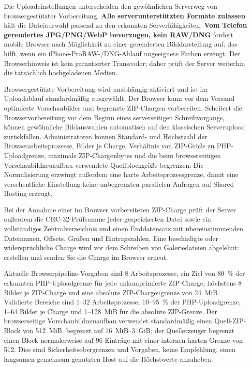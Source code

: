 \documentclass[11pt,a4paper]{article}
\newcommand{\ui}[1]{\textbf{#1}}
\begin{document}
Die Uploadeinstellungen unterscheiden den gewöhnlichen Serverweg von
browsergestützter Vorbereitung. \ui{Alle serverunterstützten Formate zulassen}
hält die Dateiauswahl passend zu den erkannten Serverfähigkeiten. \ui{Vom
Telefon gerendertes JPG/PNG/WebP bevorzugen, kein RAW/DNG} fordert mobile
Browser nach Möglichkeit zu einer gerenderten Bilddarstellung auf; das hilft,
wenn ein iPhone-ProRAW-/DNG-Ablauf ungeeignete Farben erzeugt. Der
Browserhinweis ist kein garantierter Transcoder; daher prüft der Server
weiterhin die tatsächlich hochgeladenen Medien.

Browsergestützte Vorbereitung wird unabhängig aktiviert und ist im Uploadablauf
standardmäßig ausgewählt. Der Browser kann vor dem Versand optimierte
Vorschaubilder und begrenzte ZIP-Chargen vorbereiten. Scheitert die
Browservorbereitung vor dem Beginn eines serverseitigen Schreibvorgangs, können
gewöhnliche Bildauswahlen automatisch auf den klassischen Serverupload
zurückfallen. Administratoren können Standard- und Höchstzahl der
Browserarbeitsprozesse, Bilder je Charge, Verhältnis von ZIP-Größe zu
PHP-Uploadgrenze, maximale ZIP-Chargenbytes und die beim browserseitigen
Vorschaubildneuaufbau verwendete Quellblockgröße begrenzen. Die Normalisierung
erzwingt außerdem eine harte Arbeitsprozessgrenze, damit eine versehentliche
Einstellung keine unbegrenzten parallelen Anfragen auf Shared Hosting erzeugt.

Bei der Annahme einer im Browser vorbereiteten ZIP-Charge prüft der Server
außerdem die CRC-32-Prüfsumme jeder gespeicherten Datei sowie ein vollständiges
Zentralverzeichnis und einen Enddatensatz mit übereinstimmenden Dateinamen,
Offsets, Größen und Eintragszahlen. Eine beschädigte oder widersprüchliche
Charge wird vor dem Schreiben von Galeriedateien abgelehnt; erstellen und senden
Sie die Charge im Browser erneut.

Aktuelle Browserpipeline-Vorgaben sind 8 Arbeitsprozesse, ein Ziel von 80~\% der
erkannten PHP-Uploadgrenze für jede unkomprimierte ZIP-Charge, höchstens 8
Bilder je ZIP-Charge und eine absolute ZIP-Chargengrenze von 24~MiB. Validierte
Bereiche sind 1--32 Arbeitsprozesse, 10--95~\% der PHP-Uploadgrenze, 1--64
Bilder je Charge und 1--128~MiB für die absolute ZIP-Grenze. Der browserseitige
Vorschaubildneuaufbau verwendet standardmäßig einen Quell-ZIP-Block von 512~MiB,
begrenzt auf 16~MiB--3~GiB; der Quellerzeuger begrenzt einen Block normalerweise
auf 96 Einträge mit einer internen harten Grenze von 512. Dies sind
Sicherheitsobergrenzen und Vorgaben, keine Empfehlung, einen langsamen gemeinsam
genutzten Host auf die Höchstwerte anzuheben.
\end{document}
